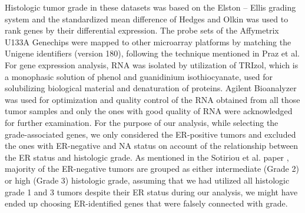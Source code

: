 \documentclass[a4paper,10pt]{article}
\begin{document}
Histologic tumor grade in these datasets was based on the Elston – 
Ellis grading system \cite{Elston1} and the standardized mean difference of Hedges 
and Olkin \cite{Hedges1} was used to rank genes by their differential expression. The probe 
sets of the Affymetrix U133A Genechips were mapped to other microarray platforms
 by matching the Unigene identifiers (version 180), following the technique mentioned in Praz et al. \cite{Cleanex}
For gene expression analysis, RNA was isolated by utilization of TRIzol, which 
is a monophasic solution of phenol and guanidinium isothiocyanate, used for 
solubilizing biological material and denaturation of proteins. Agilent Bioanalyzer 
was used for optimization and quality control of the RNA obtained from all those
 tumor samples and only the ones with good quality of RNA were acknowledged for further examination. 
For the purpose of our analysis, while selecting the grade-associated genes, 
we only considered the ER-positive tumors and excluded the ones with ER-negative
 and NA status on account of the relationship between the ER status and histologic 
grade. As mentioned in the Sotiriou et al. paper \cite{Sotiriou}, majority of the ER-negative tumors
 are grouped as either intermediate (Grade 2) or high (Grade 3) histologic grade, 
assuming that we had utilized all histologic grade 1 and 3 tumors despite their ER 
status during our analysis, we might have ended up choosing ER-identified genes
 that were falsely connected with grade.
\end{document}
